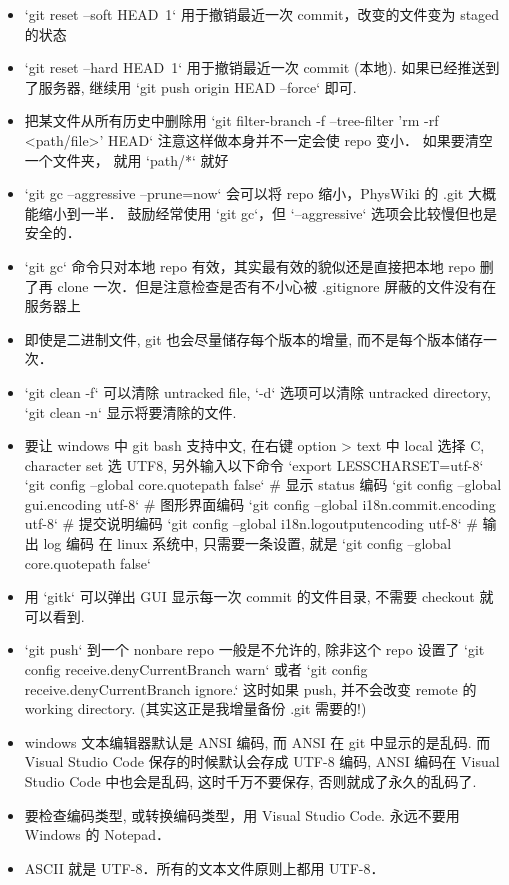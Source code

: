 \begin{itemize}
\item `git reset --soft HEAD~1` 用于撤销最近一次 commit，改变的文件变为 staged 的状态
\item `git reset --hard HEAD~1` 用于撤销最近一次 commit (本地). 如果已经推送到了服务器, 继续用 `git push origin HEAD --force` 即可.
\item 把某文件从所有历史中删除用 `git filter-branch -f --tree-filter 'rm -rf <path/file>' HEAD` 注意这样做本身并不一定会使 repo 变小． 如果要清空一个文件夹， 就用 `path/*` 就好
\item `git gc --aggressive --prune=now` 会可以将 repo 缩小，PhysWiki 的 .git 大概能缩小到一半． 鼓励经常使用 `git gc`，但 `--aggressive` 选项会比较慢但也是安全的．
\item `git gc` 命令只对本地 repo 有效，其实最有效的貌似还是直接把本地 repo 删了再 clone 一次．但是注意检查是否有不小心被 .gitignore 屏蔽的文件没有在服务器上
\item 即使是二进制文件, git 也会尽量储存每个版本的增量, 而不是每个版本储存一次．
\item `git clean -f` 可以清除 untracked file, `-d` 选项可以清除 untracked directory,  `git clean -n` 显示将要清除的文件.
\item 要让 windows 中 git bash 支持中文, 在右键 option > text 中 local 选择 C, character set 选 UTF8, 另外输入以下命令
`export LESSCHARSET=utf-8`
`git config --global core.quotepath false`          # 显示 status 编码
`git config --global gui.encoding utf-8`            # 图形界面编码
`git config --global i18n.commit.encoding utf-8`    # 提交说明编码
`git config --global i18n.logoutputencoding utf-8`  # 输出 log 编码
在 linux 系统中, 只需要一条设置, 就是
`git config --global core.quotepath false`
\item 用 `gitk` 可以弹出 GUI 显示每一次 commit 的文件目录, 不需要 checkout 就可以看到.
\item `git push` 到一个 nonbare repo 一般是不允许的, 除非这个 repo 设置了 `git config receive.denyCurrentBranch warn` 或者 `git config receive.denyCurrentBranch ignore.` 这时如果 push, 并不会改变 remote 的 working directory. (其实这正是我增量备份 .git 需要的!)
\item windows 文本编辑器默认是 ANSI 编码, 而 ANSI 在 git 中显示的是乱码. 而 Visual Studio Code 保存的时候默认会存成 UTF-8 编码, ANSI 编码在 Visual Studio Code 中也会是乱码, 这时千万不要保存, 否则就成了永久的乱码了.
\item 要检查编码类型, 或转换编码类型，用 Visual Studio Code. 永远不要用 Windows 的 Notepad．
\item ASCII 就是 UTF-8．所有的文本文件原则上都用 UTF-8．
\end{itemize}
